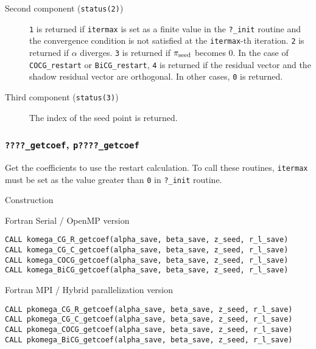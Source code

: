 \documentclass[12pt,titlepage]{article}
\begin{document}
\begin{itemize}
\begin{description}
  \item [Second component (\texttt{status(2)})]
     \verb|1| is returned if \verb|itermax| is set as a finite value in the \verb|?_init| routine and 
   the convergence condition is not satisfied at the \verb|itermax|-th iteration. 
  \verb|2| is returned if $\alpha$ diverges.
  \verb|3| is returned if $\pi_{\rm seed}$ becomes 0. 
   In the case of  \verb|COCG_restart| or \verb|BiCG_restart|, \verb|4| is returned
   if the residual vector and the shadow residual vector are orthogonal.
    In other cases,  \verb|0| is returned.

  \item [Third component (\texttt{status(3)})]
    The index of the seed point is returned.
  \end{description}

\end{itemize}

\subsubsection{\texttt{????\_getcoef}, \texttt{p????\_getcoef}}

Get the coefficients to use the restart calculation.
To call these routines, 
\verb|itermax| must be set as the value greater than \verb|0| in \verb|?_init| routine.


\noindent Construction

\noindent  Fortran Serial / OpenMP version
\begin{verbatim}
CALL komega_CG_R_getcoef(alpha_save, beta_save, z_seed, r_l_save)
CALL komega_CG_C_getcoef(alpha_save, beta_save, z_seed, r_l_save)
CALL komega_COCG_getcoef(alpha_save, beta_save, z_seed, r_l_save)
CALL komega_BiCG_getcoef(alpha_save, beta_save, z_seed, r_l_save)
\end{verbatim}

\noindent Fortran MPI / Hybrid parallelization version
\begin{verbatim}
CALL pkomega_CG_R_getcoef(alpha_save, beta_save, z_seed, r_l_save)
CALL pkomega_CG_C_getcoef(alpha_save, beta_save, z_seed, r_l_save)
CALL pkomega_COCG_getcoef(alpha_save, beta_save, z_seed, r_l_save)
CALL pkomega_BiCG_getcoef(alpha_save, beta_save, z_seed, r_l_save)
\end{verbatim}
\end{document}
